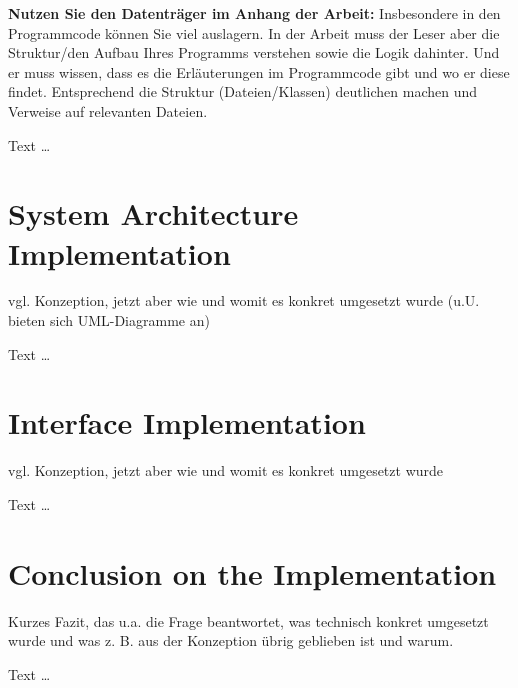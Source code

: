 \documentclass[11pt,a4paper,english]{scrreprt}
\newenvironment{comment}
  {\par\medskip
   \begingroup\color{olive}%
   }
 {\endgroup
  \medskip}
\begin{document}
\begin{comment}
\textbf{Nutzen Sie den Datenträger im Anhang der Arbeit:} Insbesondere in den Programmcode können Sie viel auslagern. In der Arbeit muss der Leser aber die Struktur/den Aufbau Ihres Programms verstehen sowie die Logik dahinter. Und er muss wissen, dass es die Erläuterungen im Programmcode gibt und wo er diese findet. Entsprechend die Struktur (Dateien/Klassen) deutlichen machen und Verweise auf relevanten Dateien.
\end{comment}

Text \dots

\section{System Architecture Implementation}
\begin{comment}
vgl. Konzeption, jetzt aber wie und womit es konkret umgesetzt wurde (u.U. bieten sich UML-Diagramme an)
\end{comment}

Text \dots

\section{Interface Implementation}
\begin{comment}
vgl. Konzeption, jetzt aber wie und womit es konkret umgesetzt wurde 
\end{comment}

Text \dots

\section{Conclusion on the Implementation}
\begin{comment}
Kurzes Fazit, das u.a. die Frage beantwortet, was technisch konkret umgesetzt wurde und was z. B. aus der Konzeption übrig geblieben ist und warum.
\end{comment}

Text \dots

\newpage
\end{document}
